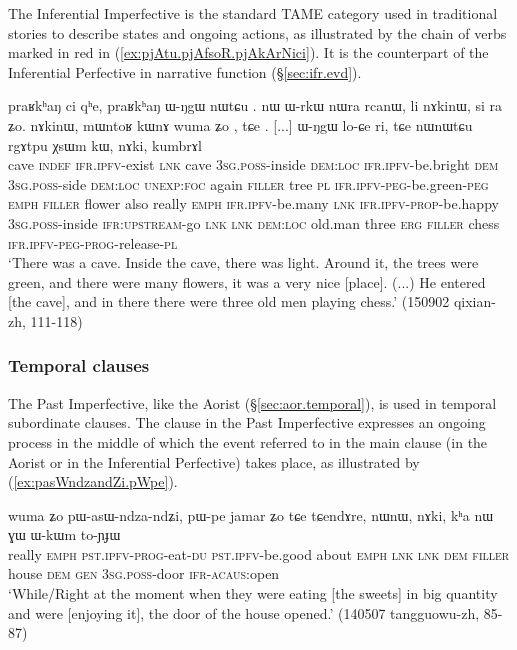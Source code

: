 The Inferential Imperfective is the standard TAME category used in traditional stories to describe states and ongoing actions, as illustrated by the chain of verbs marked in red in (\ref{ex:pjAtu.pjAfsoR.pjAkArNici}). It is the counterpart of the Inferential Perfective in narrative function  (§\ref{sec:ifr.evd}).

\begin{exe}
\ex \label{ex:pjAtu.pjAfsoR.pjAkArNici}
\gll praʁkʰaŋ ci  qʰe, praʁkʰaŋ ɯ-ŋgɯ nɯtɕu . nɯ ɯ-rkɯ nɯra rcanɯ, li nɤkinɯ, si ra  ʑo. nɤkinɯ, mɯntoʁ kɯnɤ wuma ʑo , tɕe . [...] ɯ-ŋgɯ lo-ɕe ri, tɕe nɯnɯtɕu rgɤtpu χsɯm kɯ, nɤki, kumbrɤl  \\
cave \textsc{indef} \textsc{ifr}.\textsc{ipfv}-exist \textsc{lnk} cave \textsc{3sg}.\textsc{poss}-inside \textsc{dem}:\textsc{loc} \textsc{ifr}.\textsc{ipfv}-be.bright \textsc{dem} \textsc{3sg}.\textsc{poss}-side \textsc{dem}:\textsc{loc} \textsc{unexp}:\textsc{foc} again \textsc{filler} tree \textsc{pl} \textsc{ifr}.\textsc{ipfv}-\textsc{peg}-be.green-\textsc{peg} \textsc{emph} \textsc{filler} flower also really \textsc{emph} \textsc{ifr}.\textsc{ipfv}-be.many \textsc{lnk} \textsc{ifr}.\textsc{ipfv}-\textsc{prop}-be.happy { } \textsc{3sg}.\textsc{poss}-inside \textsc{ifr}:\textsc{upstream}-go \textsc{lnk} \textsc{lnk} \textsc{dem}:\textsc{loc} old.man three \textsc{erg} \textsc{filler} chess \textsc{ifr}.\textsc{ipfv}-\textsc{peg}-\textsc{prog}-release-\textsc{pl} \\
\glt `There was a cave. Inside the cave, there was light. Around it, the trees were green, and there were many flowers, it was a very nice [place]. (...) He entered [the cave], and in there there were three old men playing chess.' (150902 qixian-zh, 111-118)
\end{exe}


\subsubsection{Temporal clauses} \label{sec:pst.ifr.ipfv.temporal}
The Past Imperfective, like the Aorist (§\ref{sec:aor.temporal}), is used in temporal subordinate clauses. The clause in the Past Imperfective expresses an ongoing process in the middle of which the event referred to in the main clause (in the Aorist or in the Inferential Perfective) takes place, as illustrated by (\ref{ex:pasWndzandZi.pWpe}).

\begin{exe}
\ex \label{ex:pasWndzandZi.pWpe}
\gll wuma ʑo pɯ-asɯ-ndza-ndʑi,  pɯ-pe jamar ʑo tɕe tɕendɤre, nɯnɯ, nɤki, kʰa nɯ ɣɯ ɯ-kɯm to-ɲɟɯ\\
really \textsc{emph} \textsc{pst}.\textsc{ipfv}-\textsc{prog}-eat-\textsc{du} \textsc{pst}.\textsc{ipfv}-be.good about \textsc{emph} \textsc{lnk} \textsc{lnk} \textsc{dem} \textsc{filler} house \textsc{dem} \textsc{gen} \textsc{3sg}.\textsc{poss}-door \textsc{ifr}-\textsc{acaus}:open\\
\glt `While/Right at the moment when they were eating [the sweets] in big quantity and were [enjoying it], the door of the house opened.' (140507 tangguowu-zh, 85-87)
\end{exe}

